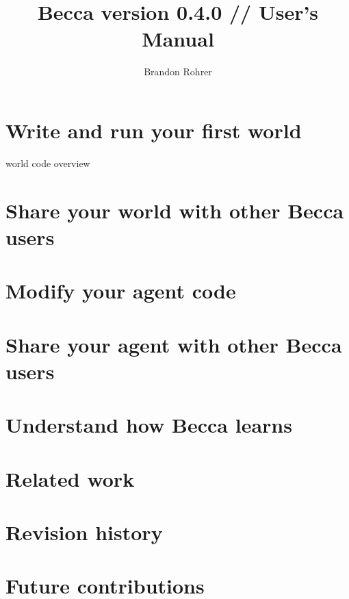 \documentclass[12pt,oneside]{book}
\begin{document}
\title{Becca version 0.4.0 // User's Manual}
\author{Brandon Rohrer}

\maketitle
\tableofcontents
\newpage

\addtolength{\parskip}{\baselineskip}

\setcounter{tocdepth}{0}



\chapter{Write and run your first world}
world code overview

\chapter{Share your world with other Becca users}

\chapter{Modify your agent code}

\chapter{Share your agent with other Becca users}

\chapter{Understand how Becca learns}

\appendix
\chapter{Related work}

\chapter{Revision history}

\chapter{Future contributions}




\end{document}
